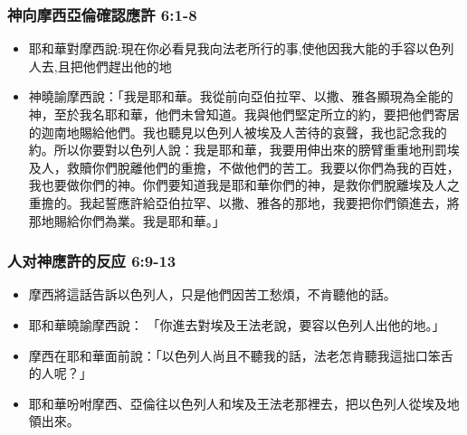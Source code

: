 \subsubsection{神向摩西亞倫確認應許 6:1-8}
\begin{itemize} 
\itemsep-.35em 
\item 耶和華對摩西說:現在你必看見我向法老所行的事,使他因我大能的手容以色列人去,且把他們趕出他的地
\item 神曉諭摩西說：「我是耶和華。我從前向亞伯拉罕、以撒、雅各顯現為全能的神，至於我名耶和華，他們未曾知道。我與他們堅定所立的約，要把他們寄居的迦南地賜給他們。我也聽見以色列人被埃及人苦待的哀聲，我也記念我的約。所以你要對以色列人說：我是耶和華，我要用伸出來的膀臂重重地刑罰埃及人，救贖你們脫離他們的重擔，不做他們的苦工。我要以你們為我的百姓，我也要做你們的神。你們要知道我是耶和華你們的神，是救你們脫離埃及人之重擔的。我起誓應許給亞伯拉罕、以撒、雅各的那地，我要把你們領進去，將那地賜給你們為業。我是耶和華。」
\end{itemize}

\subsubsection{人对神應許的反应 6:9-13}
\begin{itemize} 
\itemsep-.35em 
\item 摩西將這話告訴以色列人，只是他們因苦工愁煩，不肯聽他的話。
\item 耶和華曉諭摩西說： 「你進去對埃及王法老說，要容以色列人出他的地。」 
\item 摩西在耶和華面前說：「以色列人尚且不聽我的話，法老怎肯聽我這拙口笨舌的人呢？」\item 耶和華吩咐摩西、亞倫往以色列人和埃及王法老那裡去，把以色列人從埃及地領出來。
\end{itemize}



